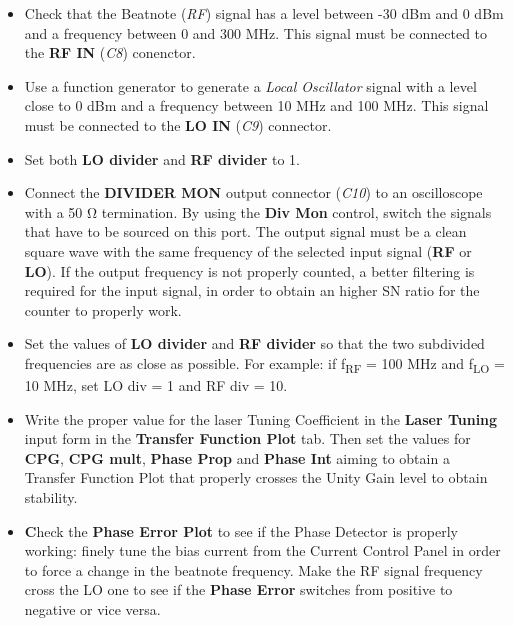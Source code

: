 \begin{itemize}
    \item Check that the Beatnote (\textit{RF}) signal has a level between -30 dBm and 0 dBm and a frequency between 0 and 300 MHz. This signal must be connected to the \textbf{RF IN} (\textit{C8}) conenctor.
    
    \item Use a function generator to generate a \textit{Local Oscillator} signal with a level close to 0 dBm and a frequency between 10 MHz and 100 MHz. This signal must be connected to the \textbf{LO IN} (\textit{C9}) connector.
    
    \item Set both \textbf{LO divider} and \textbf{RF divider} to 1.
    
    \item Connect the \textbf{DIVIDER MON} output connector (\textit{C10}) to an oscilloscope with a 50 \si{\ohm} termination. By using the \textbf{Div Mon} control, switch the signals that have to be sourced on this port. The output signal must be a clean square wave with the same frequency of the selected input signal (\textbf{RF} or \textbf{LO}).
    \newline If the output frequency is not properly counted, a better filtering is required for the input signal, in order to obtain an higher SN ratio for the counter to properly work.
    
    \item Set the values of \textbf{LO divider} and \textbf{RF divider} so that the two subdivided frequencies are as close as possible. 
    \newline For example: if f\textsubscript{RF} = 100 MHz and f\textsubscript{LO} = 10 MHz, set LO div = 1 and RF div = 10.
    
    \item Write the proper value for the laser Tuning Coefficient in the \textbf{Laser Tuning} input form in the \textbf{Transfer Function Plot} tab. Then set the values for \textbf{CPG}, \textbf{CPG mult}, \textbf{Phase Prop} and \textbf{Phase Int} aiming to obtain a Transfer Function Plot that properly crosses the Unity Gain level to obtain stability.
    
    \item \textbf Check the \textbf{Phase Error Plot} to see if the Phase Detector is properly working: finely tune the bias current from the Current Control Panel in order to force a change in the beatnote frequency. Make the RF signal frequency cross the LO one to see if the \textbf{Phase Error} switches from positive to negative or vice versa.
    

\end{itemize}
